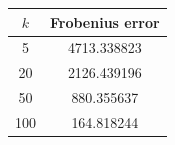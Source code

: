 \begin{tabular}[12pt]{ |c| c| }
    \hline
    {$k$} & {Frobenius error}\\ 
    \hline
    5 & 4713.338823 \\
    \hline
    20 & 2126.439196 \\
    \hline
    50 & 880.355637 \\
    \hline
    100 & 164.818244 \\
    \hline
\end{tabular}
